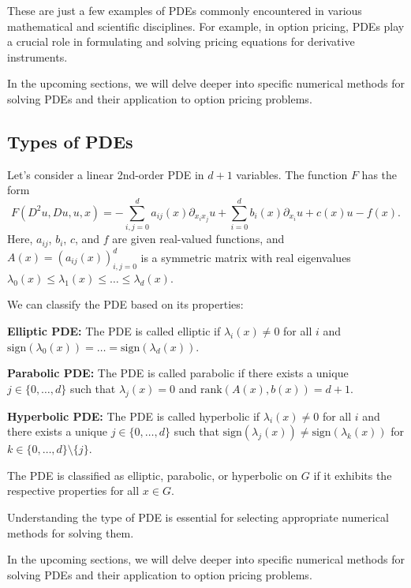 These are just a few examples of PDEs commonly encountered in various mathematical and scientific disciplines. For example, in option pricing, PDEs play a crucial role in formulating and solving pricing equations for derivative instruments.

In the upcoming sections, we will delve deeper into specific numerical methods for solving PDEs and their application to option pricing problems.

\subsection{Types of PDEs}

Let's consider a linear 2nd-order PDE in $d + 1$ variables. The function $F$ has the form
\[F(D^2u, Du, u, x) = -\sum_{i,j=0}^d a_{ij}(x) \partial_{x_i x_j} u + \sum_{i=0}^d b_i(x) \partial_{x_i} u + c(x) u - f(x).\]
Here, $a_{ij}$, $b_i$, $c$, and $f$ are given real-valued functions, and $A(x) = (a_{ij}(x))_{i,j=0}^d$ is a symmetric matrix with real eigenvalues $\lambda_0(x) \leq \lambda_1(x) \leq \ldots \leq \lambda_d(x)$.

We can classify the PDE based on its properties:

\textbf{Elliptic PDE:}
The PDE is called elliptic if $\lambda_i(x) \neq 0$ for all $i$ and $\mathrm{sign}(\lambda_0(x)) = \ldots = \mathrm{sign}(\lambda_d(x))$.

\textbf{Parabolic PDE:}
The PDE is called parabolic if there exists a unique $j \in \{0, \ldots, d\}$ such that $\lambda_j(x) = 0$ and $\mathrm{rank}(A(x), b(x)) = d + 1$.

\textbf{Hyperbolic PDE:}
The PDE is called hyperbolic if $\lambda_i(x) \neq 0$ for all $i$ and there exists a unique $j \in \{0, \ldots, d\}$ such that $\mathrm{sign}(\lambda_j(x)) \neq \mathrm{sign}(\lambda_k(x))$ for $k \in \{0, \ldots, d\} \setminus \{j\}$.

The PDE is classified as elliptic, parabolic, or hyperbolic on $G$ if it exhibits the respective properties for all $x \in G$.

Understanding the type of PDE is essential for selecting appropriate numerical methods for solving them.

In the upcoming sections, we will delve deeper into specific numerical methods for solving PDEs and their application to option pricing problems.